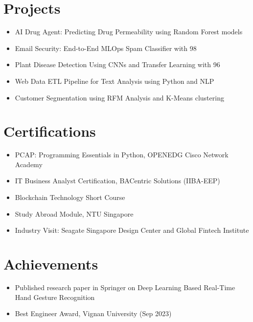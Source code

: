 \documentclass[10pt]{article}
\begin{document}
\section*{Projects}
\vspace{0.05cm}
\begin{itemize}[leftmargin=0.5cm, itemsep=2pt]

  \item AI Drug Agent: Predicting Drug Permeability using Random Forest models

  \item Email Security: End-to-End MLOps Spam Classifier with 98%

  \item Plant Disease Detection Using CNNs and Transfer Learning with 96%

  \item Web Data ETL Pipeline for Text Analysis using Python and NLP

  \item Customer Segmentation using RFM Analysis and K-Means clustering

\end{itemize}



\section*{Certifications}
\vspace{0.05cm}
\begin{itemize}[leftmargin=0.5cm, itemsep=2pt]

  \item PCAP: Programming Essentials in Python, OPENEDG Cisco Network Academy

  \item IT Business Analyst Certification, BACentric Solutions (IIBA-EEP)

  \item Blockchain Technology Short Course

  \item Study Abroad Module, NTU Singapore

  \item Industry Visit: Seagate Singapore Design Center and Global Fintech Institute

\end{itemize}



\section*{Achievements}
\vspace{0.05cm}
\begin{itemize}[leftmargin=0.5cm, itemsep=2pt]

  \item Published research paper in Springer on Deep Learning Based Real-Time Hand Gesture Recognition

  \item Best Engineer Award, Vignan University (Sep 2023)

\end{itemize}
\end{document}
